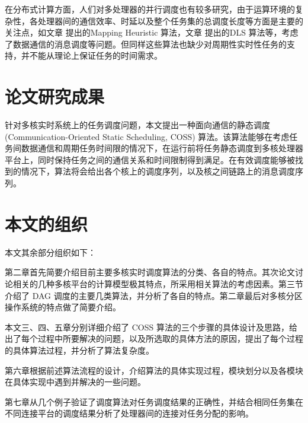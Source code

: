 
在分布式计算方面，人们对多处理器的并行调度也有较多研究，由于运算环境的复杂性，各处理器间的通信效率、时延以及整个任务集的总调度长度等方面是主要的关注点，如文章\cite{DLS} 提出的Mapping Heuristic 算法，文章\cite{Leinberger2000,Yu1991} 提出的DLS 算法等，考虑了数据通信的消息调度等问题。但同样这些算法也缺少对周期性实时性任务的支持，并不能从理论上保证任务的时间需求。


\section{论文研究成果}

针对多核实时系统上的任务调度问题，本文提出一种面向通信的静态调度 (Communication-Oriented Static Scheduling, COSS) 算法。该算法能够在考虑任务间数据通信和周期任务时间限的情况下，在运行前将任务静态调度到多核处理器平台上，同时保持任务之间的通信关系和时间限制得到满足。在有效调度能够被找到的情况下，算法将会给出各个核上的调度序列，以及核之间链路上的消息调度序列。

\section{本文的组织}

本文其余部分组织如下：

第二章首先简要介绍目前主要多核实时调度算法的分类、各自的特点。其次论文讨论相关的几种多核平台的计算模型极其特点，所采用相关算法的考虑因素。第三节介绍了 DAG 调度的主要几类算法，并分析了各自的特点。第二章最后对多核分区操作系统的特点做了简要介绍。

本文三、四、五章分别详细介绍了 COSS 算法的三个步骤的具体设计及思路，给出了每个过程中所要解决的问题，以及所选取的具体方法的原因，提出了每个过程的具体算法过程，并分析了算法复杂度。

第六章根据前述算法流程的设计，介绍算法的具体实现过程，模块划分以及各模块在具体实现中遇到并解决的一些问题。

第七章从几个例子验证了调度算法对任务调度结果的正确性，并结合相同任务集在不同连接平台的调度结果分析了处理器间的连接对任务分配的影响。